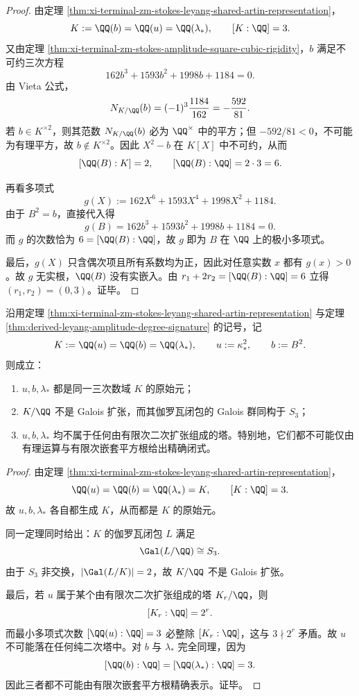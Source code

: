 \begin{proof}
由定理 \ref{thm:xi-terminal-zm-stokes-leyang-shared-artin-representation}，
\[
K:=\QQ(b)=\QQ(u)=\QQ(\lambda_*),
\qquad
[K:\QQ]=3.
\]
又由定理 \ref{thm:xi-terminal-zm-stokes-amplitude-square-cubic-rigidity}，\(b\) 满足不可约三次方程
\[
162b^3+1593b^2+1998b+1184=0.
\]
由 Vieta 公式，
\[
N_{K/\QQ}(b)
=
(-1)^3\frac{1184}{162}
=
-\frac{592}{81}.
\]
若 \(b\in K^{\times 2}\)，则其范数 \(N_{K/\QQ}(b)\) 必为 \(\QQ^\times\) 中的平方；但 \(-592/81<0\)，不可能为有理平方，故 \(b\notin K^{\times 2}\)。因此 \(X^2-b\) 在 \(K[X]\) 中不可约，从而
\[
[\QQ(B):K]=2,
\qquad
[\QQ(B):\QQ]=2\cdot 3=6.
\]

再看多项式
\[
g(X):=162X^6+1593X^4+1998X^2+1184.
\]
由于 \(B^2=b\)，直接代入得
\[
g(B)=162b^3+1593b^2+1998b+1184=0.
\]
而 \(g\) 的次数恰为 \(6=[\QQ(B):\QQ]\)，故 \(g\) 即为 \(B\) 在 \(\QQ\) 上的极小多项式。

最后，\(g(X)\) 只含偶次项且所有系数均为正，因此对任意实数 \(x\) 都有 \(g(x)>0\)。故 \(g\) 无实根，\(\QQ(B)\) 没有实嵌入。由
\(
r_1+2r_2=[\QQ(B):\QQ]=6
\)
立得 \((r_1,r_2)=(0,3)\)。证毕。
\end{proof}

\begin{theorem}\label{thm:derived-leyang-cubic-invariants-no-quadratic-radicals}
沿用定理 \ref{thm:xi-terminal-zm-stokes-leyang-shared-artin-representation} 与定理 \ref{thm:derived-leyang-amplitude-degree-signature} 的记号，记
\[
K:=\QQ(u)=\QQ(b)=\QQ(\lambda_*),
\qquad
u:=\kappa_*^2,
\qquad
b:=B^2.
\]
则成立：
\begin{enumerate}
  \item \(u,b,\lambda_*\) 都是同一三次数域 \(K\) 的原始元；
  \item \(K/\QQ\) 不是 Galois 扩张，而其伽罗瓦闭包的 Galois 群同构于 \(S_3\)；
  \item \(u,b,\lambda_*\) 均不属于任何由有限次二次扩张组成的塔。特别地，它们都不可能仅由有理运算与有限次嵌套平方根给出精确闭式。
\end{enumerate}
\end{theorem}

\begin{proof}
由定理 \ref{thm:xi-terminal-zm-stokes-leyang-shared-artin-representation}，
\[
\QQ(u)=\QQ(b)=\QQ(\lambda_*)=K,
\qquad
[K:\QQ]=3.
\]
故 \(u,b,\lambda_*\) 各自都生成 \(K\)，从而都是 \(K\) 的原始元。

同一定理同时给出：\(K\) 的伽罗瓦闭包 \(L\) 满足
\[
\Gal(L/\QQ)\cong S_3.
\]
由于 \(S_3\) 非交换，\(|\Gal(L/K)|=2\)，故 \(K/\QQ\) 不是 Galois 扩张。

最后，若 \(u\) 属于某个由有限次二次扩张组成的塔 \(K_r/\QQ\)，则
\[
[K_r:\QQ]=2^r.
\]
而最小多项式次数 \([\QQ(u):\QQ]=3\) 必整除 \([K_r:\QQ]\)，这与 \(3\nmid 2^r\) 矛盾。故 \(u\) 不可能落在任何纯二次塔中。对 \(b\) 与 \(\lambda_*\) 完全同理，因为
\[
[\QQ(b):\QQ]=[\QQ(\lambda_*):\QQ]=3.
\]
因此三者都不可能由有限次嵌套平方根精确表示。证毕。
\end{proof}

